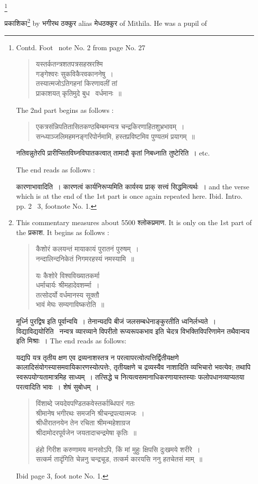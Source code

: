 \documentclass[11pt, openany]{book}
\newcommand\blfootnote[1]{%
 \begingroup
 \renewcommand\thefootnote{}\footnote{#1}%
 \addtocounter{footnote}{-1}%
 \endgroup
}
\begin{document}
\newpage
\noindent
\blfootnote{Contd. Foot \textendash\ note No. 2 from page No. 27
\begin{quote}
{\qt यस्तर्कतन्त्रशतपत्रसहस्ररश्मि\\
गङ्गेश्वरः सुकविकैरवकाननेषु~।\\
तस्यात्मजोऽतिगहनां किरणावलीं तां\\
प्राकाशयत् कृतिमुदे बुध \textendash\ वर्धमानः~॥}
\end{quote}
The 2nd part begins as follows :
\begin{quote}
{\qt एकत्रसंन्निपतितासितकण्ठबिम्बमन्यत्र चन्द्रकिरणाहितशुभ्रभावम्~।\\
सन्ध्याञ्जलिमहमनङ्गरिपोर्नमामि, हस्तप्रविष्टमिव पुण्यतमं प्रयागम्~॥}
\end{quote}
नतिवन्नुतेरपि प्रारीप्सितविघ्नविघातकत्वात् तामादौ कृतां निबध्नाति तुष्टेरिति~। etc.

The end reads as follows :

कारणाभावादिति~। कारणत्वं कार्यनिरूप्यमिति कार्यस्य प्राक् सत्त्वं सिद्धमित्यर्थः~। and the verse which is at the end of the 1st part is once again repeated here. Ibid. Intro. pp. 2 \textendash\ 3, footnote No. 1.}
प्रकाशिका\renewcommand{\thefootnote}{1}\footnote{This commentary measures about 5500 श्लोकप्रमाण. It is only on the 1st part of the प्रकाश. It begins as follows :
\begin{quote}
{\qt कैशोरं कलयन्तं मायाकायं पुरातनं पुरुषम्~।\\
नन्दालिन्दनिकेतं निगमरहस्यं नमस्यामि~॥

यः कैशोरे विश्वविख्यातकर्मा\\
धर्माचार्यः श्रीमहादेवशर्म्मा~।\\
तत्सोदर्यो वर्धमानस्य सूक्तौ\\
भावं मेघः सम्यगाविष्करोति~॥}
\end{quote}

मूर्ध्नि पुरद्विष इति पूर्वान्वयि~। तेनान्यदपि बीजं जलसम्बधेनाङ्कुरतीति ध्वनिर्लभ्यते~। विद्याविद्ययोरिति \textendash\ नन्वत्र व्यारव्याने विपरीतो रूप्यरूपकभाव इति चेदत्र विभक्तिविपरिणामेन तथैवान्वय इति मिश्राः~।
The end reads as follows:

यद्यपि यत्र तृतीय क्षण एव द्रव्यनाशस्तत्र न परत्वापरत्वोत्पत्तिर्द्वितीयक्षणे कालादिसंयोगस्यासमवायिकारणस्योत्पत्तेः, तृतीयक्षणे च द्रव्यस्यैव नाशादिति व्यभिचारो भवत्येव; तथापि स्वरूपयोग्यतामात्रमिह साध्यम्~। तत्सिद्धे च नित्यत्वसमानाधिकरणायास्तस्याः फलोपधानव्याप्यतया परत्वादिति भावः~। शेषं सुबोधम्~।
\begin{quote}
{\qt विंशाब्दे जयदेवपण्डितकवेस्तर्काब्धिपारं गतः\\
श्रीमानेष भगीरथः समजनि श्रीचन्द्रपत्यात्मजः~।\\
श्रीधीरातनयेन तेन रचिता श्रीमन्महेशाग्रज \textendash\ \\
श्रीदामोदरपूर्वजेन जयतादाचन्द्रमेषा कृतिः~॥

हंहो गिरीश करुणामय मानसोऽपि, किं मां मुहुः क्षिपसि दुःखमये शरीरे~।\\
सत्कर्म तादृंगिति चेन्ननु चन्द्रचूड, तत्कर्म कारयसि ननु हतचेतसं माम्~॥}
\end{quote}
\noindent
Ibid page 3, foot note No. 1.} by भगीरथ ठक्कुर alias मेधठक्कुर of Mithila. He was a
pupil of
\end{document}
